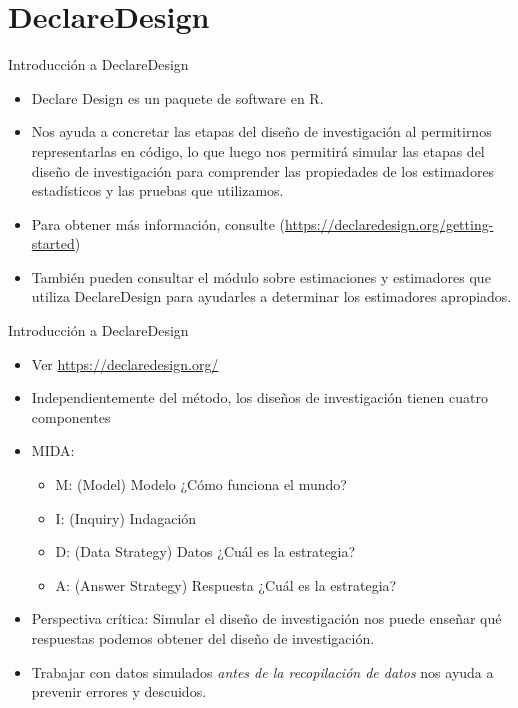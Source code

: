 \documentclass[
  ignorenonframetext,
]{beamer}
\providecommand{\tightlist}{%
  \setlength{\itemsep}{0pt}\setlength{\parskip}{0pt}}
\begin{document}
\hypertarget{declaredesign}{%
\section{DeclareDesign}\label{declaredesign}}

\begin{frame}{Introducción a DeclareDesign}
\protect\hypertarget{introducciuxf3n-a-declaredesign}{}
\begin{itemize}
\item
  Declare Design es un paquete de software en R.
\item
  Nos ayuda a concretar las etapas del diseño de investigación al
  permitirnos representarlas en código, lo que luego nos permitirá
  simular las etapas del diseño de investigación para comprender las
  propiedades de los estimadores estadísticos y las pruebas que
  utilizamos.
\item
  Para obtener más información, consulte
  (\url{https://declaredesign.org/getting-started})
\item
  También pueden consultar el módulo sobre estimaciones y estimadores
  que utiliza DeclareDesign para ayudarles a determinar los estimadores
  apropiados.
\end{itemize}
\end{frame}

\begin{frame}{Introducción a DeclareDesign}
\protect\hypertarget{introducciuxf3n-a-declaredesign-1}{}
\begin{itemize}
\item
  Ver \url{https://declaredesign.org/}
\item
  Independientemente del método, los diseños de investigación tienen
  cuatro componentes
\item
  MIDA:

  \begin{itemize}
  \tightlist
  \item
    M: (Model) Modelo ¿Cómo funciona el mundo?
  \item
    I: (Inquiry) Indagación
  \item
    D: (Data Strategy) Datos ¿Cuál es la estrategia?
  \item
    A: (Answer Strategy) Respuesta ¿Cuál es la estrategia?
  \end{itemize}
\item
  Perspectiva crítica: Simular el diseño de investigación nos puede
  enseñar qué respuestas podemos obtener del diseño de investigación.
\item
  Trabajar con datos simulados \emph{antes de la recopilación de datos}
  nos ayuda a prevenir errores y descuidos.
\end{itemize}
\end{frame}
\end{document}
